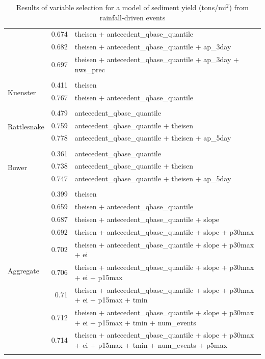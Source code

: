 \documentclass[10pt]{article}
\begin{document}
\begin{table}[h]
\begin{center}
\begin{tabular}{lrl}
 & 0.674 & theisen + antecedent\_qbase\_quantile\\ 
 & 0.682 & theisen + antecedent\_qbase\_quantile + ap\_3day\\ 
 & 0.697 & theisen + antecedent\_qbase\_quantile + ap\_3day + nws\_prec\\ 
\vspace{2mm}\\ \multirow{3}{*}{Kuenster} & 0.411 & theisen\\ 
 & 0.767 & theisen + antecedent\_qbase\_quantile\\ 
\vspace{2mm}\\ \multirow{4}{*}{Rattlesnake} & 0.479 & antecedent\_qbase\_quantile\\ 
 & 0.759 & antecedent\_qbase\_quantile + theisen\\ 
 & 0.778 & antecedent\_qbase\_quantile + theisen + ap\_5day\\ 
\vspace{2mm}\\ \multirow{4}{*}{Bower} & 0.361 & antecedent\_qbase\_quantile\\ 
 & 0.738 & antecedent\_qbase\_quantile + theisen\\ 
 & 0.747 & antecedent\_qbase\_quantile + theisen + ap\_5day\\ 
\vspace{2mm}\\ \multirow{10}{*}{Aggregate} & 0.399 & theisen\\ 
 & 0.659 & theisen + antecedent\_qbase\_quantile\\ 
 & 0.687 & theisen + antecedent\_qbase\_quantile + slope\\ 
 & 0.692 & theisen + antecedent\_qbase\_quantile + slope + p30max\\ 
 & 0.702 & theisen + antecedent\_qbase\_quantile + slope + p30max + ei\\ 
 & 0.706 & theisen + antecedent\_qbase\_quantile + slope + p30max + ei + p15max\\ 
 & 0.71 & theisen + antecedent\_qbase\_quantile + slope + p30max + ei + p15max + tmin\\ 
 & 0.712 & theisen + antecedent\_qbase\_quantile + slope + p30max + ei + p15max + tmin + num\_events\\ 
 & 0.714 & theisen + antecedent\_qbase\_quantile + slope + p30max + ei + p15max + tmin + num\_events + p5max\\ 
\vspace{2mm}\\     \end{tabular}
    \caption{Results of variable selection for a model of sediment yield (tons/$\text{mi}^2$) from rainfall-driven events\label{sed_r_square_nosnow}}
    \end{center}
\end{table}
\end{document}
